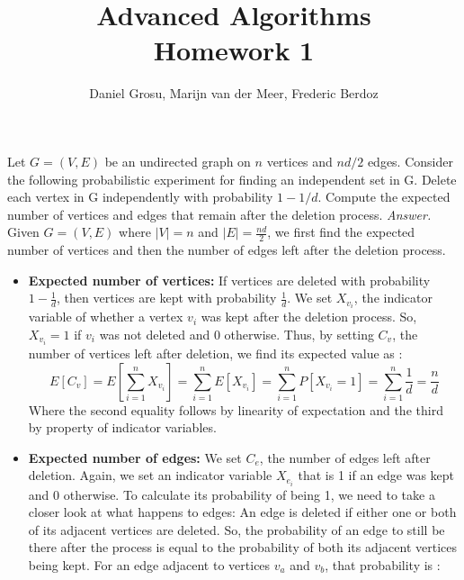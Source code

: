 \documentclass[10pt]{article}
\newenvironment{exercise}[2][Exercise]{\begin{trivlist}
  \item[\hskip \labelsep {\bfseries #1}\hskip \labelsep {\bfseries #2.}]}{\end{trivlist}}
\begin{document}
	
  \renewcommand{\qedsymbol}{\smiley}
	\title{Advanced Algorithms \\ Homework 1}
	\author{Daniel Grosu, Marijn van der Meer, Frederic Berdoz}
	
	\maketitle

  \begin{exercise}{1a}
Let $G = (V,E)$ be an undirected graph on $n$ vertices and $nd/2$ edges. Consider the following probabilistic experiment for finding an independent set in G. Delete each vertex in G independently with probability $1-1/d$. Compute the expected number of vertices and edges that remain after the deletion process. \newline 
\emph{Answer.} Given $G = (V,E)$ where $|V| = n$ and $|E| = \frac{nd}{2}$, we first find the expected number of vertices and then the number of edges left after the deletion process. \newline
\begin{itemize}
  \item \textbf{Expected number of vertices:} If vertices are deleted with probability $1-\frac{1}{d}$, then vertices are kept with probability $\frac{1}{d}$. We set $X_{v_i}$, the indicator variable of whether a vertex $v_i$ was kept after the deletion process. So,  $X_{v_i} = 1$ if  $v_i$ was not deleted and $0$ otherwise. Thus, by setting $C_v$, the number of vertices left after deletion, we find its expected value as : 
  \begin{equation}
      E[C_v] = E[\sum_{i = 1}^{n}X_{v_i}] = \sum_{i = 1}^{n}E[X_{v_i}] = \sum_{i = 1}^{n}P[X_{v_i}=1] = \sum_{i = 1}^{n}\frac{1}{d} = \frac{n}{d}
  \end{equation}
  Where the second equality follows by linearity of expectation and the third by property of indicator variables. 
  \item  \textbf{Expected number of edges:} We set $C_e$, the number of edges left after deletion. Again, we set an indicator variable $X_{e_i}$ that is 1 if an edge was kept and $0$ otherwise. To calculate its probability of being 1, we need to take a closer look at what happens to edges: \newline
  An edge is deleted if either one or both of its adjacent vertices are deleted. So, the probability of an edge to still be there after the process is equal to the probability of both its adjacent vertices being kept. For an edge adjacent to vertices $v_a$ and $v_b$, that probability is : 

\end{itemize}
\end{exercise}
\end{document}
